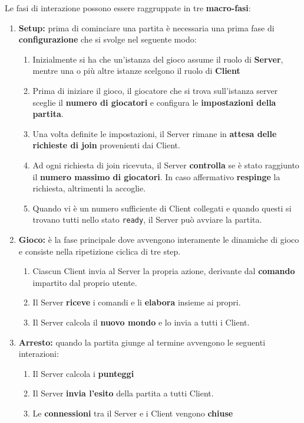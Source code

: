 Le fasi di interazione possono essere raggruppate in tre \textbf{macro-fasi}:
\begin{enumerate}
    \item \textbf{Setup:} prima di cominciare una partita è necessaria una prima fase di \textbf{configurazione} che si svolge nel seguente modo:
        \begin{enumerate}
            \item Inizialmente si ha che un'istanza del gioco assume il ruolo di \textbf{Server}, mentre una o più altre istanze scelgono il ruolo di \textbf{Client}
            \item Prima di iniziare il gioco, il giocatore che si trova sull'istanza server sceglie il \textbf{numero di giocatori} e configura le \textbf{impostazioni della partita}.
            \item Una volta definite le impostazioni, il Server rimane in \textbf{attesa delle richieste di join} provenienti dai Client.
            \item Ad ogni richiesta di join ricevuta, il Server \textbf{controlla} se è stato raggiunto il \textbf{numero massimo di giocatori}. In caso affermativo \textbf{respinge} la richiesta, altrimenti la accoglie.
            \item Quando vi è un numero sufficiente di Client collegati e quando questi si trovano tutti nello stato \texttt{ready}, il Server può avviare la partita.
        \end{enumerate}
    \item \textbf{Gioco:} è la fase principale dove avvengono interamente le dinamiche di gioco e consiste nella ripetizione ciclica di tre step.
        \begin{enumerate}
            \item Ciascun Client invia al Server la propria azione, derivante dal \textbf{comando} impartito dal proprio utente.
            \item Il Server \textbf{riceve} i comandi e li \textbf{elabora} insieme ai propri.
            \item Il Server calcola il \textbf{nuovo mondo} e lo invia a tutti i Client.
        \end{enumerate}
    \item \textbf{Arresto:} quando la partita giunge al termine avvengono le seguenti interazioni:
        \begin{enumerate}
            \item Il Server calcola i \textbf{punteggi}
            \item Il Server \textbf{invia l'esito} della partita a tutti Client.
            \item Le \textbf{connessioni} tra il Server e i Client vengono \textbf{chiuse}
        \end{enumerate}
\end{enumerate}

